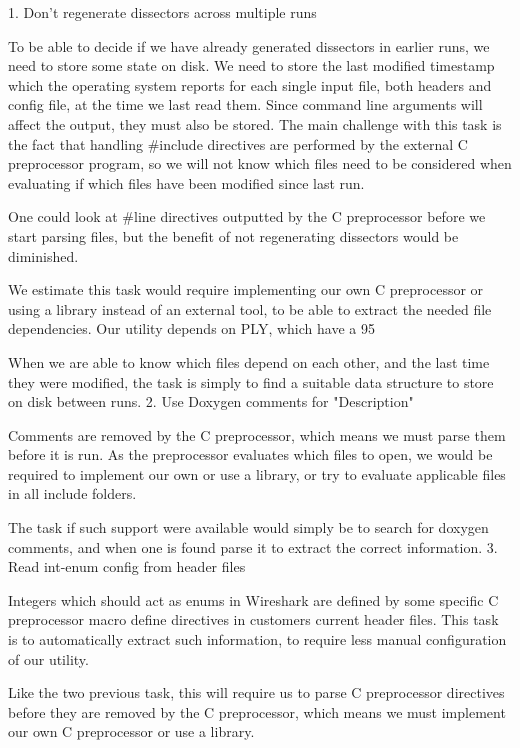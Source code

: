 1. Don't regenerate dissectors across multiple runs

To be able to decide if we have already generated dissectors in earlier runs, we need to store some state on disk. We need to store the last modified timestamp which the operating system reports for each single input file, both headers and config file, at the time we last read them. Since command line arguments will affect the output, they must also be stored. The main challenge with this task is the fact that handling #include directives are performed by the external C preprocessor program, so we will not know which files need to be considered when evaluating if which files have been modified since last run.

One could look at #line directives outputted by the C preprocessor before we start parsing files, but the benefit of not regenerating dissectors would be diminished.

We estimate this task would require implementing our own C preprocessor or using a library instead of an external tool, to be able to extract the needed file dependencies. Our utility depends on PLY, which have a 95%

When we are able to know which files depend on each other, and the last time they were modified, the task is simply to find a suitable data structure to store on disk between runs.
2. Use Doxygen comments for "Description"

Comments are removed by the C preprocessor, which means we must parse them before it is run. As the preprocessor evaluates which files to open, we would be required to implement our own or use a library, or try to evaluate applicable files in all include folders.

The task if such support were available would simply be to search for doxygen comments, and when one is found parse it to extract the correct information.
3. Read int-enum config from header files

Integers which should act as enums in Wireshark are defined by some specific C preprocessor macro define directives in customers current header files. This task is to automatically extract such information, to require less manual configuration of our utility.

Like the two previous task, this will require us to parse C preprocessor directives before they are removed by the C preprocessor, which means we must implement our own C preprocessor or use a library.

